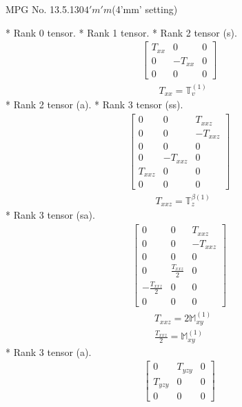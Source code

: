 \documentclass[fleqn,8pt,landscape]{jsarticle}
\begin{document}
\setcounter{MaxMatrixCols}{32}

\renewcommand{\tablename}{Table~}
\renewcommand{\figurename}{Figure~}
\begin{center}
\LARGE
MPG No. 13.5.130\quad$4'm'm$\quad(4'mm' setting)
\end{center}
* Rank 0 tensor.
* Rank 1 tensor.
* Rank 2 tensor (s).
\begin{align*}
\begin{bmatrix} T_{xx} & 0 & 0 \\ 0 & - T_{xx} & 0 \\ 0 & 0 & 0 \end{bmatrix}
\end{align*}
\begin{align*}
& T_{xx} = \mathbb{T}_{v}^{(1)}
\end{align*}
* Rank 2 tensor (a).
* Rank 3 tensor (ss).
\begin{align*}
\begin{bmatrix} 0 & 0 & T_{xxz} \\ 0 & 0 & - T_{xxz} \\ 0 & 0 & 0 \\ 0 & - T_{xxz} & 0 \\ T_{xxz} & 0 & 0 \\ 0 & 0 & 0 \end{bmatrix}
\end{align*}
\begin{align*}
& T_{xxz} = \mathbb{T}_{z}^{\beta(1)}
\end{align*}
* Rank 3 tensor (sa).
\begin{align*}
\begin{bmatrix} 0 & 0 & T_{xxz} \\ 0 & 0 & - T_{xxz} \\ 0 & 0 & 0 \\ 0 & \frac{T_{xxz}}{2} & 0 \\ - \frac{T_{xxz}}{2} & 0 & 0 \\ 0 & 0 & 0 \end{bmatrix}
\end{align*}
\begin{align*}
& T_{xxz} = 2 \mathbb{M}_{xy}^{(1)} \\
& \frac{T_{xxz}}{2} = \mathbb{M}_{xy}^{(1)}
\end{align*}
* Rank 3 tensor (a).
\begin{align*}
\begin{bmatrix} 0 & T_{yzy} & 0 \\ T_{yzy} & 0 & 0 \\ 0 & 0 & 0 \end{bmatrix}
\end{align*}
\end{document}
